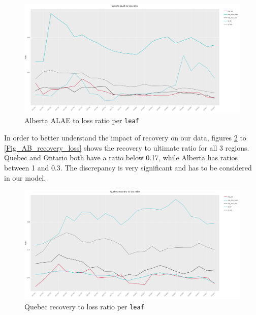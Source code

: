 	\begin{figure}[H]
		\begin{center}
				\includegraphics[scale=0.2]{Graphiques/AB_ALAE_loss} 
			\renewcommand{\figurename}{Figure}
			\caption{Alberta ALAE to loss ratio per \texttt{leaf}}\label{Fig_AB_ALAE_loss}
		\end{center}
	\end{figure}
	In order to better understand the impact of recovery on our data, figures \ref{Fig_QC_recovery_loss} to \ref{Fig_AB_recovery_loss} shows the recovery to ultimate ratio for all 3 regions. Quebec and Ontario both have a ratio below 0.17, while Alberta has ratios between 1 and 0.3. The discrepancy is very significant and has to be considered in our model.
		\begin{figure}[H]
		\begin{center}
			\includegraphics[scale=0.2]{Graphiques/QC_recovery_loss} 
			\renewcommand{\figurename}{Figure}
			\caption{Quebec recovery to loss ratio per \texttt{leaf}}\label{Fig_QC_recovery_loss}
		\end{center}
	\end{figure}
	
